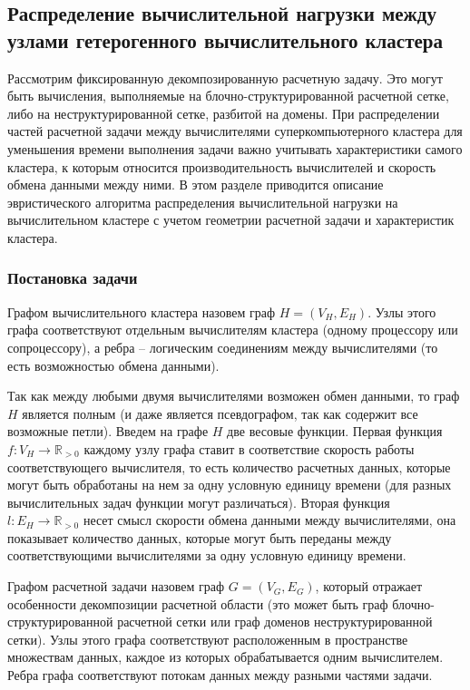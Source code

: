 \subsection{Распределение вычислительной нагрузки между узлами гетерогенного вычислительного кластера}\label{sec:text_2_getero}

Рассмотрим фиксированную декомпозированную расчетную задачу.
Это могут быть вычисления, выполняемые на блочно-структурированной расчетной сетке, либо на неструктурированной сетке, разбитой на домены.
При распределении частей расчетной задачи между вычислителями суперкомпьютерного кластера для уменьшения времени выполнения задачи важно учитывать характеристики самого кластера, к которым относится производительность вычислителей и скорость обмена данными между ними.
В этом разделе приводится описание эвристического алгоритма распределения вычислительной нагрузки на вычислительном кластере с учетом геометрии расчетной задачи и характеристик кластера.

\subsubsection{Постановка задачи}

\begin{definition}
Графом вычислительного кластера назовем граф $H = (V_H, E_H)$.
Узлы этого графа соответствуют отдельным вычислителям кластера (одному процессору или сопроцессору), а ребра -- логическим соединениям между вычислителями (то есть возможностью обмена данными).
\end{definition}

Так как между любыми двумя вычислителями возможен обмен данными, то граф $H$ является полным (и даже является псевдографом, так как содержит все возможные петли).
Введем на графе $H$ две весовые функции.
Первая функция $f: V_H \rightarrow \mathbb{R}_{> 0}$ каждому узлу графа ставит в соответствие скорость работы соответствующего вычислителя, то есть количество расчетных данных, которые могут быть обработаны на нем за одну условную единицу времени (для разных вычислительных задач функции могут различаться).
Вторая функция $l: E_H \rightarrow \mathbb{R}_{> 0}$ несет смысл скорости обмена данными между вычислителями, она показывает количество данных, которые могут быть переданы между соответствующими вычислителями за одну условную единицу времени.

\begin{definition}
Графом расчетной задачи назовем граф $G = (V_G, E_G)$, который отражает особенности декомпозиции расчетной области (это может быть граф блочно-структурированной расчетной сетки или граф доменов неструктурированной сетки).
Узлы этого графа соответствуют расположенным в пространстве множествам данных, каждое из которых обрабатывается одним вычислителем.
Ребра графа соответствуют потокам данных между разными частями задачи.
\end{definition}

